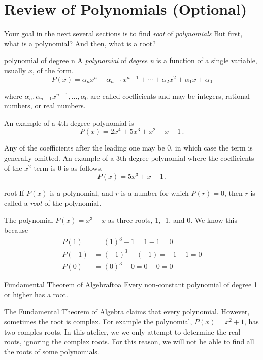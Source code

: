 \section{Review of Polynomials (Optional)}
\label{sec.general}

Your goal in the next several sections is to find \emph{root} of \emph{polynomials}
But first, what is a polynomial? And then, what is a root?

\begin{definition}{polynomial of degree n}{}
  A \emph{polynomial} of \emph{degree n} is a function of a single variable, usually $x$,
  of the form.
  \[P(x) = \alpha_n x^n + \alpha_{n-1} x^{n-1} + \cdots + \alpha_2 x^2 + \alpha_1 x + \alpha_0 \]

  where $\alpha_n,  \alpha_{n-1} x^{n-1}, \ldots, \alpha_0$ are called coefficients and may be integers, rational numbers, or real numbers.
\end{definition}

An example of a 4th degree polynomial is
\[P(x) = 2 x^4 + 5 x^3 + x^2 - x + 1\,.\]


Any of the coefficients after the leading one may be 0, in which case the term is generally omitted.
An example of a 3th degree polynomial where the coefficients of the $x^2$ term is 0 is as follows.
\[P(x) = 5 x^3 + x - 1\,.\]

\begin{definition}{root}{}
  If $P(x)$ is a polynomial, and $r$ is a number for which $P(r)=0$, then $r$ is called a \emph{root}
  of the polynomial.
\end{definition}

The polynomial $P(x) = x^3 - x$ as three roots, 1, -1, and 0.  We know this because
\begin{align*}
  P(1) &= (1)^3 - 1 
  = 1 - 1 
  = 0\\[3pt]
  P(-1) &= (-1)^3 - (-1) 
  = -1 + 1 
  = 0\\[3pt]
  P(0) &= (0)^3 - 0
  = 0 - 0 
  = 0  
\end{align*}

\begin{theorem}{Fundamental Theorem of Algebra}{ftoa}
  Every non-constant polynomial of degree 1 or higher has a root.
\end{theorem}

The Fundamental Theorem of Algebra claims that every polynomial.  However, sometimes the root is complex.
For example the polynomial, $P(x) = x^2 + 1$, has two comples roots.
In this atelier, we we only attempt to determine the real roots, ignoring the complex roots.
For this reason, we will not be able to find all the roots of some polynomials.

